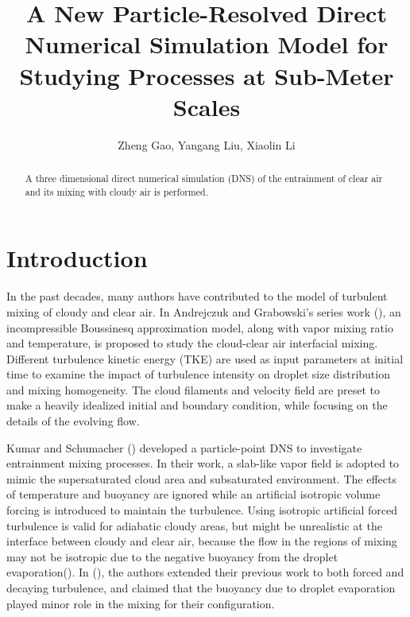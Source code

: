 \documentclass[12pt]{article}
\begin{document}
\title{A New Particle-Resolved Direct Numerical Simulation Model for Studying
Processes at Sub-Meter Scales}
\author{Zheng Gao,
Yangang Liu,
Xiaolin Li}
\maketitle


\begin{abstract}
A three dimensional direct numerical simulation (DNS) of the entrainment 
of clear air and its mixing with cloudy air is performed. 
\end{abstract}

\section{Introduction}
In the past decades, many authors have contributed to the model of
turbulent mixing of cloudy and clear air. In Andrejczuk and Grabowski's series work (\cite{And04,And06,And09}), an incompressible Boussinesq approximation model, along with vapor mixing ratio and temperature, is proposed to study the cloud-clear air interfacial mixing. Different turbulence kinetic energy (TKE) are used as input parameters at initial time to examine the impact of turbulence intensity on droplet size distribution and mixing homogeneity. The cloud filaments and velocity field are preset to make a heavily idealized initial and boundary condition, while focusing on the details of the evolving flow. 

Kumar and Schumacher (\cite{Kumar11,Kumar12}) developed a particle-point DNS to investigate entrainment mixing processes. In their work, a slab-like vapor field is adopted to mimic the supersaturated cloud area and subsaturated environment. The effects of temperature and buoyancy are ignored while an artificial isotropic volume forcing is introduced to maintain the turbulence. Using isotropic artificial forced turbulence is valid for adiabatic cloudy areas, but might be unrealistic at the interface between cloudy and clear air, because the flow in the regions of mixing may not be isotropic due to the negative buoyancy from the droplet evaporation(\cite{Vaillancourt00}). In (\cite{Kumar14}), the authors extended their previous work to both forced and decaying turbulence, and claimed that the buoyancy due to droplet evaporation played minor role in the mixing for their configuration.
\end{document}
